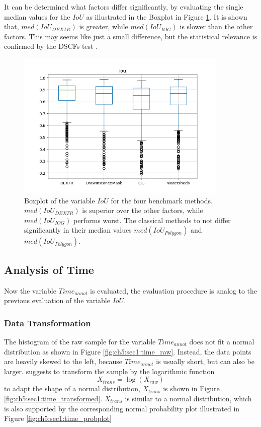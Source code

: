 It can be determined what factors differ significantly, by evaluating the single median values for the $IoU$ as illustrated in the Boxplot in Figure \ref{fig:ch5:sec1:iou_boxplot}.
It is shown that, $med \left( IoU_{DEXTR} \right)$ is greater, while $med \left( IoU_{IOG} \right)$ is slower than the other factors. 
This may seems like just a small difference, but the statistical relevance is confirmed by the DSCFs  test \cite{CF91-dscf}.
\begin{figure}
	\centering
	\includegraphics[width=0.9\textwidth]{figures/chap51_boxplot_iou.png}
	\caption[Boxplot IoU per method]{
		Boxplot of the variable $IoU$ for the four benchmark methods.
		$med \left( IoU_{DEXTR} \right)$ is superior over the other factors, while $med \left( IoU_{IOG} \right)$ performs worst.
		The classical methods to not differ significantly in their median values $med \left( IoU_{Polygon} \right)$ and $med \left( IoU_{Polygon} \right)$.
	} \label{fig:ch5:sec1:iou_boxplot}
\end{figure}




\subsection{Analysis of Time}\label{ord:ch5:sec1:subsec3}
Now the variable $Time_{annot}$ is evaluated, the evaluation procedure is analog to the previous evaluation of the variable $IoU$.
\subsubsection{Data Transformation}

The histogram of the raw sample for the variable $Time_{annot}$ does not fit a normal distribution as shown in Figure \ref{fig:ch5:sec1:time_raw}.
Instead, the data points are heavily skewed to the left, because $Time_{annot}$ is usually short, but can also be larger.
\cite{PS16-Statistics} suggests to transform the sample by the logarithmic function 
\begin{equation} \label{equ:trans_time}
	X_{trans} = \log \left( X_{raw} \right) 
\end{equation}
to adapt the shape of a normal distribution, $X_{trans}$ is shown in Figure \ref{fig:ch5:sec1:time_transformed}.
$X_{trans}$ is similar to a normal distribution, which is also supported by the corresponding normal probability plot illustrated in Figure \ref{fig:ch5:sec1:time_probplot}

